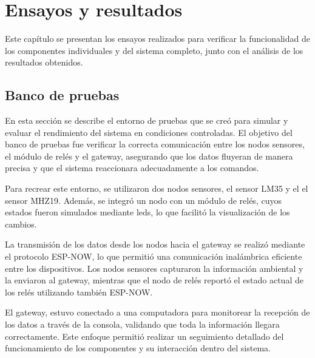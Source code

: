 
\chapter{Ensayos y resultados} %

\label{Chapter4} %


Este capítulo se presentan los ensayos realizados para verificar la funcionalidad de los componentes individuales y del sistema completo, junto con el análisis de los resultados obtenidos.

\section{Banco de pruebas}

En esta sección se describe el entorno de pruebas que se creó para simular y evaluar el rendimiento del sistema en condiciones controladas. El objetivo del banco de pruebas fue verificar la correcta comunicación entre los nodos sensores, el módulo de relés y el gateway, asegurando que los datos fluyeran de manera precisa y que el sistema reaccionara adecuadamente a los comandos.

Para recrear este entorno, se utilizaron dos nodos sensores, el sensor LM35 y el el sensor MHZ19. Además, se integró un nodo con un módulo de relés, cuyos estados fueron simulados mediante leds, lo que facilitó la visualización de los cambios.

La transmisión de los datos desde los nodos hacia el gateway se realizó mediante el protocolo ESP-NOW, lo que permitió una comunicación inalámbrica eficiente entre los dispositivos. Los nodos sensores capturaron la información ambiental y la enviaron al gateway, mientras que el nodo de relés reportó el estado actual de los relés utilizando también ESP-NOW.

El gateway, estuvo conectado a una computadora para monitorear la recepción de los datos a través de la consola, validando que toda la información llegara correctamente. Este enfoque permitió realizar un seguimiento detallado del funcionamiento de los componentes y su interacción dentro del sistema.

